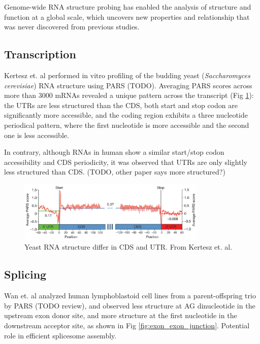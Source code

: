 \documentclass{proposal}
\begin{document}
Genome-wide RNA structure probing has enabled the analysis of structure and function at a global scale,
which uncovers new properties and relationship that was never discovered from previous studies.

\subsection*{Transcription}

Kertesz et. al\cite{kertesz2010genome} performed in vitro profiling of ﻿the budding yeast
(\textit{Saccharomyces cerevisiae}) RNA structure using PARS (TODO).
Averaging PARS scores across more than $3000$ mRNAs revealed a unique pattern across the transcript (Fig \ref{fig:yeast_cds_utr}):
 the UTRs are less structured than the CDS, both start and stop codon are significantly more accessible,
and the coding region exhibits a three nucleotide periodical pattern,
where the first nucleotide is more accessible and the second one is less accessible.

In contrary, although RNAs in human show a similar start/stop codon accessibility and CDS periodicity,
it was observed that UTRs are only slightly less structured than CDS\cite{wan2014landscape}.  (TODO, other paper says more structured?)


\begin{figure}[h!]
    \centering
    \includegraphics[width=0.8\textwidth]{yeast_cds_utr.png}
    \caption{Yeast RNA structure differ in CDS and UTR. From Kertesz et. al\cite{kertesz2010genome}.}
    \label{fig:yeast_cds_utr}
    \centering
\end{figure}



\subsection*{Splicing}

Wan et. al\cite{wan2014landscape} analyzed human lymphoblastoid cell lines from a parent-offspring trio by PARS (TODO review),
and observed less structure at AG dinucleotide in the upstream exon donor site,
and more structure at the first nucleotide in the downstream acceptor site, as shown in Fig \ref{fig:exon_exon_junction}.
Potential role in efficient splicesome assembly.
\end{document}

